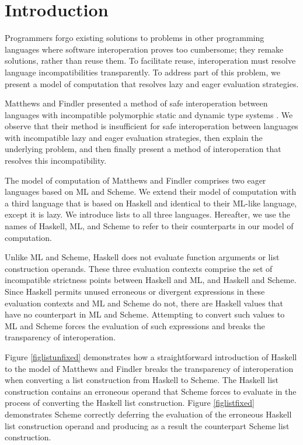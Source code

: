 \section{Introduction}

Programmers forgo existing solutions to problems in other programming languages where software interoperation proves too cumbersome; they remake solutions, rather than reuse them. To facilitate reuse, interoperation must resolve language incompatibilities transparently. To address part of this problem, we present a model of computation that resolves lazy and eager evaluation strategies.

Matthews and Findler presented a method of safe interoperation between languages with incompatible polymorphic static and dynamic type systems \cite{matthews07}. We observe that their method is insufficient for safe interoperation between languages with incompatible lazy and eager evaluation strategies, then explain the underlying problem, and then finally present a method of interoperation that resolves this incompatibility.

The model of computation of Matthews and Findler comprises two eager languages based on ML and Scheme. We extend their model of computation with a third language that is based on Haskell and identical to their ML-like language, except it is lazy. We introduce lists to all three languages. Hereafter, we use the names of Haskell, ML, and Scheme to refer to their counterparts in our model of computation.

Unlike ML and Scheme, Haskell does not evaluate function arguments or list construction operands. These three evaluation contexts comprise the set of incompatible strictness points between Haskell and ML, and Haskell and Scheme. Since Haskell permits unused erroneous or divergent expressions in these evaluation contexts and ML and Scheme do not, there are Haskell values that have no counterpart in ML and Scheme. Attempting to convert such values to ML and Scheme forces the evaluation of such expressions and breaks the transparency of interoperation.





Figure \ref{figlistunfixed} demonstrates how a straightforward introduction of Haskell to the model of Matthews and Findler breaks the transparency of interoperation when converting a list construction from Haskell to Scheme. The Haskell list construction contains an erroneous operand that Scheme forces to evaluate in the process of converting the Haskell list construction. Figure \ref{figlistfixed} demonstrates Scheme correctly deferring the evaluation of the erroneous Haskell list construction operand and producing as a result the counterpart Scheme list construction.

